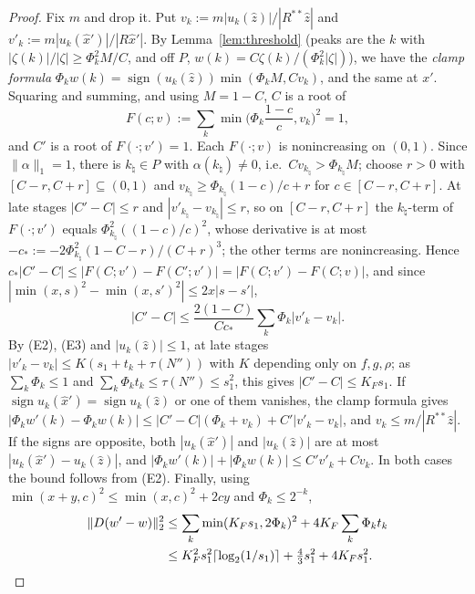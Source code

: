 \documentclass[10pt]{amsart}
\theoremstyle{definition}
\theoremstyle{remark}
\newcommand{\sgn}{\operatorname{sign}}
\newcommand{\zh}{\hat z}
\begin{document}
\begin{proof}
Fix $m$ and drop it.  Put $v_k:=m|u_k(\zh)|/|R^{**}\zh|$ and
$v'_k:=m|u_k(\hat x')|/|R\hat x'|$.  By Lemma~\ref{lem:threshold} (peaks
are the $k$ with $|\zeta(k)|/|\zeta|\ge\Phi_k^2M/C$, and off $P$,
$w(k)=C\zeta(k)/(\Phi_k^2|\zeta|)$), we have the \emph{clamp formula}
$\Phi_kw(k)=\sgn(u_k(\zh))\min(\Phi_kM,Cv_k)$, and the same at $x'$.
Squaring and summing, and using $M=1-C$, $C$ is a root of
\[
 F(c;v):=\sum_k\min\Big(\Phi_k\frac{1-c}c,v_k\Big)^2=1,
\]
and $C'$ is a root of $F(\cdot;v')=1$.  Each $F(\cdot;v)$ is nonincreasing on
$(0,1)$.  Since $\|\alpha\|_1=1$, there is $k_\natural\in P$ with
$\alpha(k_\natural)\ne0$, i.e.\ $Cv_{k_\natural}>\Phi_{k_\natural}M$; choose
$r>0$ with $[C-r,C+r]\subseteq(0,1)$ and $v_{k_\natural}\ge
\Phi_{k_\natural}(1-c)/c+r$ for $c\in[C-r,C+r]$.  At late stages
$|C'-C|\le r$ and $|v'_{k_\natural}-v_{k_\natural}|\le r$, so on
$[C-r,C+r]$ the $k_\natural$-term of $F(\cdot;v')$ equals
$\Phi_{k_\natural}^2((1-c)/c)^2$, whose derivative is at most
$-c_*:=-2\Phi_{k_\natural}^2(1-C-r)/(C+r)^3$; the other terms are
nonincreasing.  Hence $c_*|C'-C|\le|F(C;v')-F(C';v')|=|F(C;v')-F(C;v)|$, and
since $|\min(x,s)^2-\min(x,s')^2|\le2x|s-s'|$,
\[
 |C'-C|\le\frac{2(1-C)}{Cc_*}\sum_k\Phi_k|v'_k-v_k| .
\]
By (E2), (E3) and $|u_k(\zh)|\le1$, at late stages $|v'_k-v_k|\le
K(s_1+t_k+\tau(N''))$ with $K$ depending only on $f,g,\rho$; as
$\sum_k\Phi_k\le1$ and $\sum_k\Phi_kt_k\le\tau(N'')\le s_1^2$, this gives
$|C'-C|\le K_Fs_1$.  If $\sgn u_k(\hat x')=\sgn u_k(\zh)$ or one of them
vanishes, the clamp formula gives $|\Phi_kw'(k)-\Phi_kw(k)|\le
|C'-C|(\Phi_k+v_k)+C'|v'_k-v_k|$, and $v_k\le m/|R^{**}\zh|$.  If the signs
are opposite, both $|u_k(\hat x')|$ and $|u_k(\zh)|$ are at most
$|u_k(\hat x')-u_k(\zh)|$, and $|\Phi_kw'(k)|+|\Phi_kw(k)|\le C'v'_k+Cv_k$.
In both cases the bound follows from (E2).  Finally, using
$\min(x+y,c)^2\le\min(x,c)^2+2cy$ and $\Phi_k\le2^{-k}$,
\begin{align*}
 \|D(w'-w)\|_2^2&\le\sum_k\min(K_Fs_1,2\Phi_k)^2+4K_F\sum_k\Phi_kt_k\\
 &\le K_F^2s_1^2\lceil\log_2(1/s_1)\rceil+\tfrac43s_1^2+4K_Fs_1^2 .
 \qedhere
\end{align*}
\end{proof}
\end{document}
